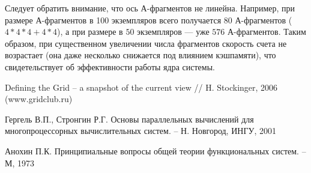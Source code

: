 \documentclass[a4paper,11pt]{article} %
\begin{document}
	Следует обратить внимание, что ось А-фрагментов не линейна. Например, при размере \mbox{А-фрагментов} в 100 экземпляров всего получается $80$ А-фрагментов ($4*4*4 + 4*4$), а при размере
	в $50$ экземпляров --- уже $576$ А-фрагментов. Таким образом, при существенном увеличении числа
	фрагментов скорость счета не возрастает (она даже несколько снижается под влиянием кэш\-памяти), что свидетельствует об эффективности работы ядра системы.
	{\sloppy
		
	}
	\newpage
	\thispagestyle{empty}
	\begin{thebibliography}{99}
		
		Defining the Grid -- a snapshot of the current view // H. Stockinger, 2006 (www.gridclub.ru)
		
		Гергель В.П., Стронгин Р.Г. Основы параллельных вычислений для многопроцессорных вычислительных систем. -- Н. Новгород, ИНГУ, 2001
		
		Анохин П.К. Принципиальные вопросы общей теории функциональных систем. -- М, 1973
		
	\end{thebibliography}
\end{document}
